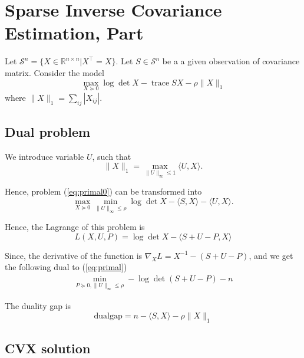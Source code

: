 \documentclass[conference,onecolumn,12pt]{IEEEtran}
\newcommand\tr{{{\operatorname{trace}}}}
\newcommand{\R}{\mathbb{R}}
\newcommand{\<}{\langle}
\renewcommand{\>}{\rangle}
\numberwithin{equation}{section}
\begin{document}
\section{Sparse Inverse Covariance Estimation, Part \uppercase\expandafter{}}

Let $\mathcal{S}^n = \{{X}\in \R^{n\times n}| {X}^\top  = {X}\}$. Let ${S}\in \mathcal{S}^n$ be a a given observation of covariance matrix. Consider the model
\begin{equation}
\label{eq:primal0}
    \max_{{X}\succeq 0} \log \det {X} - \tr{{S}{X}} - \rho\|{X}\|_1
\end{equation}
where $\|{X}\|_1 = \sum_{ij} |{X}_{ij}|$.
\subsection{Dual problem}

We introduce variable ${U}$, such that
\begin{equation}
    \|{X}\|_1 = \max_{\|{U}\|_{\infty}\leq 1} \<{U},{X}\>.
\end{equation}

Hence, problem (\ref{eq:primal0}) can be transformed into
\begin{equation}
    \label{eq:primal}
        \max_{{X}\succeq 0} \min_{\|{U}\|_{\infty}\leq \rho} \log \det {X} - \<{S},{X}\> - \<{U},{X}\>.
\end{equation}

Hence, the Lagrange of this problem is
\begin{equation}
\label{eq:lag}
L({X},{U},{P}) = \log \det {X} - \<{S}+{U}-{P},{X}\>
\end{equation}

Since, the derivative of the function is $\nabla_{{X}} L = {X}^{-1}-({S}+{U}-{P})$, and we get the following dual to (\ref{eq:primal})
\begin{equation}
\begin{split}
    \min_{{P}\succeq 0, \|{U}\|_\infty \leq \rho} -\log \det({S}+{U}-{P}) - n
\end{split}
\end{equation}

The duality gap is
\begin{equation}
    \mathrm{dualgap} = n - \<{S},{X}\> - \rho\|{X}\|_1
    \label{eq:dualgap}
\end{equation}

\subsection{CVX solution}
\end{document}
